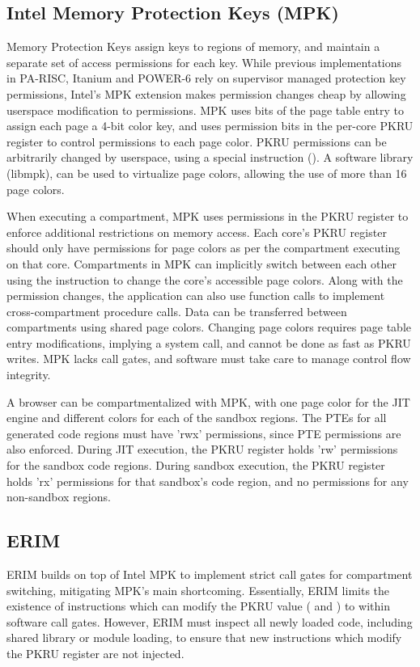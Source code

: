 \subsection{Intel Memory Protection Keys (MPK)}
Memory Protection Keys assign keys to regions of memory, and maintain
a separate set of access permissions for each key.
While previous implementations in PA-RISC, Itanium and POWER-6 rely on 
supervisor managed protection key permissions, Intel's MPK extension
makes permission changes cheap by allowing userspace modification to
permissions.
MPK uses bits of the page table entry to assign each page a 4-bit color key,
and uses permission bits in the per-core PKRU register to control permissions
to each page color.
PKRU permissions can be arbitrarily changed by userspace, using a special
instruction ().
A software library (libmpk), can be used to virtualize page colors, allowing
the use of more than 16 page colors.

When executing a compartment, MPK uses permissions in the PKRU register
to enforce additional restrictions on memory access. 
Each core's PKRU register should only have permissions for page colors as
per the compartment executing on that core.
Compartments in MPK can implicitly switch between each other using the 
 instruction to change the core's accessible page colors.
Along with the permission changes, the application can also use 
function calls to implement cross-compartment procedure calls.
Data can be transferred between compartments using shared page colors.
Changing page colors requires page table entry modifications, implying a
system call, and cannot be done as fast as PKRU writes.
MPK lacks call gates, and software must take care to manage control flow
integrity.

A browser can be compartmentalized with MPK, with one page color for the JIT
engine and different colors for each of the sandbox regions.
The PTEs for all generated code regions must have 'rwx' permissions, 
since PTE permissions are also enforced.
During JIT execution, the PKRU register holds 'rw' permissions for the
sandbox code regions.
During sandbox execution, the PKRU register holds 'rx' permissions for that
sandbox's code region, and no permissions for any non-sandbox regions.

\subsection{ERIM}
ERIM builds on top of Intel MPK to implement strict call gates for
compartment switching, mitigating MPK's main shortcoming.
Essentially, ERIM limits the existence of instructions which can
modify the PKRU value ( and ) to within
software call gates.
However, ERIM must inspect all newly loaded code, including shared
library or module loading, to ensure that new instructions which
modify the PKRU register are not injected.

